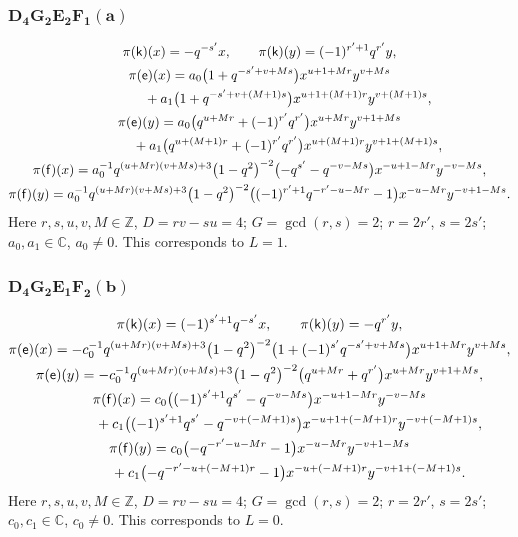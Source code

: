 \documentclass[pdftex]{sigma}
\numberwithin{equation}{section}
\begin{document}
\subsubsection*{$\boldsymbol{D_4G_2E_2F_1(a)}$}
\begin{gather*}
\pi(\mathsf{k})(x)= -q^{-s'}x ,\qquad\pi(\mathsf{k})(y)=(-1)^{r'+1}q^{r'}y ,\\
\pi(\mathsf{e})(x)= a_0\big(1+q^{-s'+v+Ms}\big)x^{u+1+Mr}y^{v+Ms}\\
\hphantom{\pi(\mathsf{e})(x)=}{}+ a_1\big(1+q^{-s'+v+(M+1)s}\big)x^{u+1+(M+1)r}y^{v+(M+1)s} ,\\
\pi(\mathsf{e})(y)= a_0\big(q^{u+Mr}+(-1)^{r'}q^{r'}\big)x^{u+Mr}y^{v+1+Ms}\\
\hphantom{\pi(\mathsf{e})(y)=}{}+ a_1\big(q^{u+(M+1)r}+(-1)^{r'}q^{r'}\big)x^{u+(M+1)r}y^{v+1+(M+1)s} ,\\
\pi(\mathsf{f})(x)= a_0^{-1}q^{(u+Mr)(v+Ms)+3}\big(1-q^2\big)^{-2}\big({-}q^{s'}-q^{-v-Ms}\big)x^{-u+1-Mr}y^{-v-Ms} ,\\
\pi(\mathsf{f})(y)= a_0^{-1}q^{(u+Mr)(v+Ms)+3}\big(1-q^2\big)^{-2}\big((-1)^{r'+1}q^{-r'-u-Mr}-1\big)x^{-u-Mr}y^{-v+1-Ms} .
\end{gather*}
Here $r,s,u,v,M\in\mathbb{Z}$, $D=rv-su=4$; $G=\operatorname{gcd}(r,s)=2$; $r=2r'$, $s=2s'$; $a_0,a_1\in\mathbb{C}$, $a_0\ne 0$. This corresponds to $L=1$.

\subsubsection*{$\boldsymbol{D_4G_2E_1F_2(b)}$}
\begin{gather*}
\pi(\mathsf{k})(x)= (-1)^{s'+1}q^{-s'}x ,\qquad\pi(\mathsf{k})(y)=-q^{r'}y ,\\
\pi(\mathsf{e})(x)= -c_0^{-1}q^{(u+Mr)(v+Ms)+3}\big(1-q^2\big)^{-2}\big(1+(-1)^{s'}q^{-s'+v+Ms}\big)x^{u+1+Mr}y^{v+Ms} ,\\
\pi(\mathsf{e})(y)= -c_0^{-1}q^{(u+Mr)(v+Ms)+3}\big(1-q^2\big)^{-2}\big(q^{u+Mr}+q^{r'}\big)x^{u+Mr}y^{v+1+Ms} ,\\
\pi(\mathsf{f})(x)= c_0\big((-1)^{s'+1}q^{s'}-q^{-v-Ms}\big)x^{-u+1-Mr}y^{-v-Ms}\\
\hphantom{\pi(\mathsf{f})(x)=}{} + c_1\big((-1)^{s'+1}q^{s'}-q^{-v+(-M+1)s}\big)x^{-u+1+(-M+1)r}y^{-v+(-M+1)s} ,\\
\pi(\mathsf{f})(y)= c_0\big({-}q^{-r'-u-Mr}-1\big)x^{-u-Mr}y^{-v+1-Ms}\\
\hphantom{\pi(\mathsf{f})(y)=}{} + c_1\big({-}q^{-r'-u+(-M+1)r}-1\big)x^{-u+(-M+1)r}y^{-v+1+(-M+1)s} .
\end{gather*}
Here $r,s,u,v,M\in\mathbb{Z}$, $D=rv-su=4$; $G=\operatorname{gcd}(r,s)=2$; $r=2r'$, $s=2s'$; $c_0,c_1\in\mathbb{C}$, $c_0\ne 0$. This corresponds to $L=0$.
\end{document}
